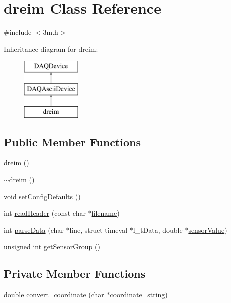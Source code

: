 \hypertarget{classdreim}{\section{dreim Class Reference}
\label{classdreim}
}


{\ttfamily \#include $<$3m.\-h$>$}

Inheritance diagram for dreim\-:\begin{figure}[H]
\begin{center}
\leavevmode
\includegraphics[height=3.000000cm]{classdreim}
\end{center}
\end{figure}
\subsection*{Public Member Functions}
\begin{DoxyCompactItemize}
\item 
\hyperlink{classdreim_ad5b00af326cf07b655691ee8644b9a44}{dreim} ()
\item 
\hyperlink{classdreim_a6f2a2a0a6694900935ba67cb198cc914}{$\sim$dreim} ()
\item 
void \hyperlink{classdreim_ae519ec4beeebe38402cdae1d475f1aaa}{set\-Config\-Defaults} ()
\item 
int \hyperlink{classdreim_a298f4f39711f41fd5e69d562d2e74bb7}{read\-Header} (const char $\ast$\hyperlink{classDAQDevice_a7f9cda7cf5b41f6b134c313477e9644b}{filename})
\item 
int \hyperlink{classdreim_ab0adce023f0af72491fe36dc2e228a4f}{parse\-Data} (char $\ast$line, struct timeval $\ast$l\-\_\-t\-Data, double $\ast$\hyperlink{classDAQDevice_ad148188c57598fdf4fd4c1c333aeb0d8}{sensor\-Value})
\item 
unsigned int \hyperlink{classdreim_a32184278a7ac6d365217f3e6b1023067}{get\-Sensor\-Group} ()
\end{DoxyCompactItemize}
\subsection*{Private Member Functions}
\begin{DoxyCompactItemize}
\item 
double \hyperlink{classdreim_a087d1cf984ffc5da8b6829cff898a6d0}{convert\-\_\-coordinate} (char $\ast$coordinate\-\_\-string)
\end{DoxyCompactItemize}
